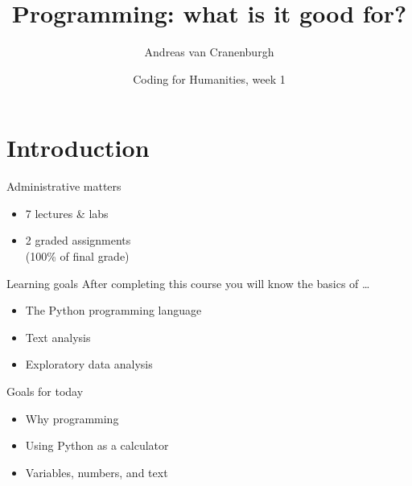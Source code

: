 \documentclass{beamer}
\title{Programming: what is it good for?}
\author{Andreas van Cranenburgh}
\date{Coding for Humanities, week 1}
\begin{document}
\begin{frame}
 \titlepage
\end{frame}

\begin{frame}
 \tableofcontents
\end{frame}

\section{Introduction}

\frame{\tableofcontents[currentsection]}

\begin{frame}{Administrative matters}
	\begin{itemize}
		\item 7 lectures \& labs
		\item 2 graded assignments \\
			(100\% of final grade)
	\end{itemize}
\end{frame}

\begin{frame}{Learning goals}
	After completing this course you will know the basics of \dots
	\begin{itemize}
		\item The Python programming language
		\item Text analysis
		\item Exploratory data analysis
	\end{itemize}
\end{frame}

\begin{frame}{Goals for today}
	\begin{itemize}
		\item Why programming
		\item Using Python as a calculator
		\item Variables, numbers, and text
	\end{itemize}
\end{frame}
\end{document}
